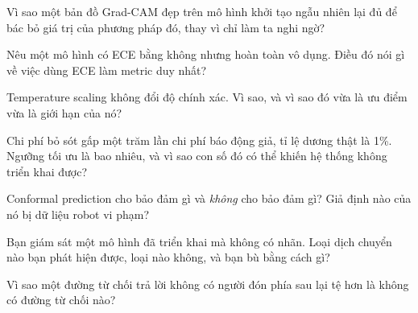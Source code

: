\documentclass[../../deep_learning.tex]{subfiles}
\begin{document}
\begin{tukiem}
\item Vì sao một bản đồ Grad-CAM đẹp trên mô hình khởi tạo ngẫu nhiên lại đủ để bác bỏ giá trị của phương pháp đó, thay vì chỉ làm ta nghi ngờ?
\item Nêu một mô hình có ECE bằng không nhưng hoàn toàn vô dụng. Điều đó nói gì về việc dùng ECE làm metric duy nhất?
\item Temperature scaling không đổi độ chính xác. Vì sao, và vì sao đó vừa là ưu điểm vừa là giới hạn của nó?
\item Chi phí bỏ sót gấp một trăm lần chi phí báo động giả, tỉ lệ dương thật là 1\%. Ngưỡng tối ưu là bao nhiêu, và vì sao con số đó có thể khiến hệ thống không triển khai được?
\item Conformal prediction cho bảo đảm gì và \emph{không} cho bảo đảm gì? Giả định nào của nó bị dữ liệu robot vi phạm?
\item Bạn giám sát một mô hình đã triển khai mà không có nhãn. Loại dịch chuyển nào bạn phát hiện được, loại nào không, và bạn bù bằng cách gì?
\item Vì sao một đường từ chối trả lời không có người đón phía sau lại tệ hơn là không có đường từ chối nào?
\end{tukiem}
\ifSubfilesClassLoaded{\printbibliography[title={Nguồn}]}{}
\end{document}
